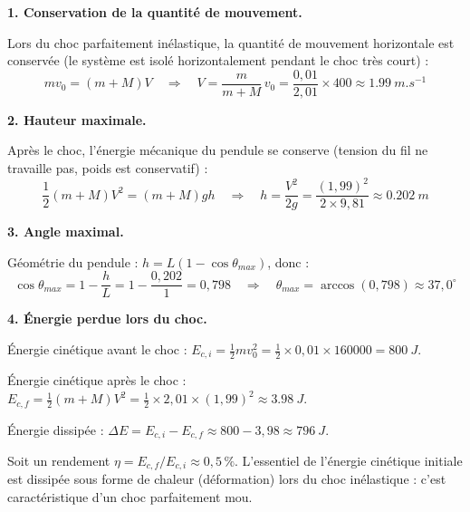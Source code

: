 \documentclass[12pt,a4paper]{article}
\begin{document}
\begin{boitecorrige}
\textbf{1. Conservation de la quantité de mouvement.}

Lors du choc parfaitement inélastique, la quantité de mouvement horizontale est conservée (le système est isolé horizontalement pendant le choc très court) :
\[
mv_0 = (m+M)V \quad \Rightarrow \quad V = \frac{m}{m+M}\,v_0 = \frac{0{,}01}{2{,}01}\times400 \approx \qty{1.99}{m.s^{-1}}
\]

\textbf{2. Hauteur maximale.}

Après le choc, l'énergie mécanique du pendule se conserve (tension du fil ne travaille pas, poids est conservatif) :
\[
\frac{1}{2}(m+M)V^2 = (m+M)gh \quad \Rightarrow \quad h = \frac{V^2}{2g} = \frac{(1{,}99)^2}{2\times9{,}81} \approx \qty{0.202}{m}
\]

\textbf{3. Angle maximal.}

Géométrie du pendule : $h = L(1 - \cos\theta_{max})$, donc :
\[
\cos\theta_{max} = 1 - \frac{h}{L} = 1 - \frac{0{,}202}{1} = 0{,}798 \quad \Rightarrow \quad \theta_{max} = \arccos(0{,}798) \approx 37{,}0^\circ
\]

\textbf{4. Énergie perdue lors du choc.}

Énergie cinétique avant le choc : $E_{c,i} = \frac{1}{2}mv_0^2 = \frac{1}{2}\times0{,}01\times160000 = \qty{800}{J}$.

Énergie cinétique après le choc : $E_{c,f} = \frac{1}{2}(m+M)V^2 = \frac{1}{2}\times2{,}01\times(1{,}99)^2 \approx \qty{3.98}{J}$.

Énergie dissipée : $\Delta E = E_{c,i} - E_{c,f} \approx 800 - 3{,}98 \approx \qty{796}{J}$.

Soit un rendement $\eta = E_{c,f}/E_{c,i} \approx 0{,}5\,\%$. L'essentiel de l'énergie cinétique initiale est dissipée sous forme de chaleur (déformation) lors du choc inélastique : c'est caractéristique d'un choc parfaitement mou.
\end{boitecorrige}

\ifdefined\inMainDoc\else
\end{document}
